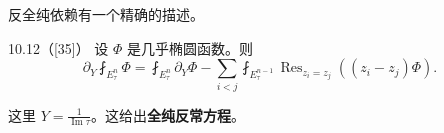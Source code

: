
反全纯依赖有一个精确的描述。

\begin{wthm}{10.12（[35]）}
  设 $\Phi$ 是几乎椭圆函数。则
  \[
    \partial_Y\fint_{E_\tau^n}\Phi
    =\fint_{E_\tau^n}\partial_Y\Phi
    -\sum_{i<j}\fint_{E_\tau^{n-1}}
    \operatorname{Res}_{z_i=z_j}\left((z_i-z_j)\Phi\right).
  \]
\end{wthm}

这里 $Y=\frac{1}{\operatorname{Im}\tau}$。这给出\textbf{全纯反常方程}。

